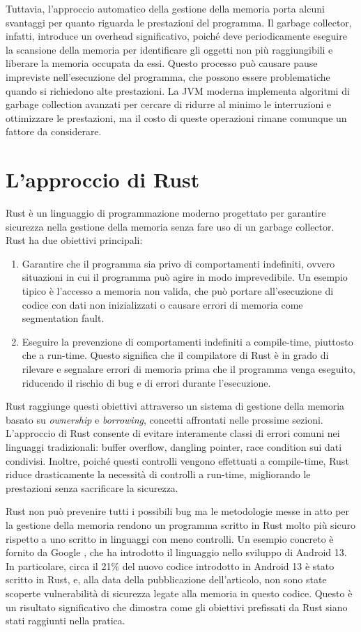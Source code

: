 Tuttavia, l'approccio automatico della gestione della memoria porta alcuni svantaggi per quanto riguarda le prestazioni del programma. Il garbage collector, infatti, introduce un overhead significativo, poiché deve periodicamente eseguire la scansione della memoria per identificare gli oggetti non più raggiungibili e liberare la memoria occupata da essi. Questo processo può causare pause impreviste nell'esecuzione del programma, che possono essere problematiche quando si richiedono alte prestazioni. La JVM moderna implementa algoritmi di garbage collection avanzati per cercare di ridurre al minimo le interruzioni e ottimizzare le prestazioni, ma il costo di queste operazioni rimane comunque un fattore da considerare. 
\section{L'approccio di Rust}
Rust è un linguaggio di programmazione moderno progettato per garantire sicurezza nella gestione della memoria senza fare uso di un garbage collector. Rust ha due obiettivi principali:
\begin{enumerate}
    \item  Garantire che il programma sia privo di comportamenti indefiniti, ovvero situazioni in cui il programma può agire in modo imprevedibile. Un esempio tipico è l'accesso a memoria non valida, che può portare all'esecuzione di codice con dati non inizializzati o causare errori di memoria come segmentation fault. 
    \item Eseguire la prevenzione di comportamenti indefiniti a compile-time, piuttosto che a run-time. Questo significa che il compilatore di Rust è in grado di rilevare e segnalare errori di memoria prima che il programma venga eseguito, riducendo il rischio di bug e di errori durante l'esecuzione. 
\end{enumerate}
Rust raggiunge questi obiettivi attraverso un sistema di gestione della memoria basato su \textit{ownership} e \textit{borrowing}, concetti affrontati nelle prossime sezioni. L'approccio di Rust consente di evitare interamente classi di errori comuni nei linguaggi tradizionali: buffer overflow, dangling pointer, race condition sui dati condivisi. Inoltre, poiché questi controlli vengono effettuati a compile-time, Rust riduce drasticamente la necessità di controlli a run-time, migliorando le prestazioni senza sacrificare la sicurezza. 

Rust non può prevenire tutti i possibili bug ma le metodologie messe in atto per la gestione della memoria rendono un programma scritto in Rust molto più sicuro rispetto a uno scritto in linguaggi con meno controlli. Un esempio concreto è fornito da Google \cite{android13-memorysafe}, che ha introdotto il linguaggio nello sviluppo di Android 13. In particolare, circa il 21\% del nuovo codice introdotto in Android 13 è stato scritto in Rust, e, alla data della pubblicazione dell'articolo, non sono state scoperte vulnerabilità di sicurezza legate alla memoria in questo codice. Questo è un risultato significativo che dimostra come gli obiettivi prefissati da Rust siano stati raggiunti nella pratica.


